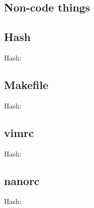 \documentclass[10pt]{article}
\newcommand{\inputfile}[2]{
    Hash: \texttt{}
    
}
\begin{document}
\begin{multicols*}{3}
    \tableofcontents


    \section{Non-code things}
    \subsection{Hash}
    \inputfile{hash.sh}{txt}
    \subsection{Makefile}
    \inputfile{Makefile}{txt}
    \subsection{vimrc}
    \inputfile{vimrc}{txt}
    \subsection{nanorc}
    \inputfile{nanorc}{txt}

\end{multicols*}
\end{document}
